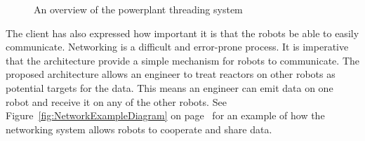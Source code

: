 \documentclass[english,12pt]{scrartcl}
\begin{document}
\begin{landscape}
\begin{figure}[h]
				\caption {An overview of the \gls{powerplant} threading system}
				\label{fig:PowerPlantThreadingOverviewDiagram}
			\end{figure}
			\end{landscape}

			The client has also expressed how important it is that the robots be able to easily communicate. Networking is a difficult and error-prone process.
			It is imperative that the architecture provide a simple mechanism for robots to communicate.
			The proposed architecture allows an engineer to treat \glspl{reactor} on other robots as potential targets for the data.
			This means an engineer can emit data on one robot and receive it on any of the other robots. See Figure~\ref{fig:NetworkExampleDiagram} on page~\pageref{fig:NetworkExampleDiagram} for an example of how the networking system allows robots to cooperate and share data.
\end{document}
